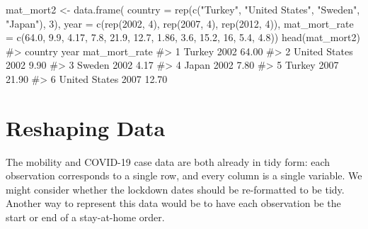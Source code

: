\documentclass[
  letterpaper,
]{latex/krantz}
\makeatletter
\newenvironment{Shaded}{\begin{snugshade}}{\end{snugshade}}
\newcommand{\AttributeTok}[1]{\textcolor[rgb]{0.40,0.45,0.13}{#1}}
\newcommand{\CommentTok}[1]{\textcolor[rgb]{0.37,0.37,0.37}{#1}}
\newcommand{\DecValTok}[1]{\textcolor[rgb]{0.68,0.00,0.00}{#1}}
\newcommand{\FloatTok}[1]{\textcolor[rgb]{0.68,0.00,0.00}{#1}}
\newcommand{\FunctionTok}[1]{\textcolor[rgb]{0.28,0.35,0.67}{#1}}
\newcommand{\NormalTok}[1]{\textcolor[rgb]{0.00,0.23,0.31}{#1}}
\newcommand{\OtherTok}[1]{\textcolor[rgb]{0.00,0.23,0.31}{#1}}
\newcommand{\StringTok}[1]{\textcolor[rgb]{0.13,0.47,0.30}{#1}}
\newenvironment{kframe}{%
\medskip{}
\setlength{\fboxsep}{.8em}
 \def\at@end@of@kframe{}%
 \ifinner\ifhmode%
  \def\at@end@of@kframe{\end{minipage}}%
  \begin{minipage}{\columnwidth}%
 \fi\fi%
 \def\FrameCommand##1{\hskip\@totalleftmargin \hskip-\fboxsep
 \colorbox{shadecolor}{##1}\hskip-\fboxsep
     \hskip-\linewidth \hskip-\@totalleftmargin \hskip\columnwidth}%
 \MakeFramed {\advance\hsize-\width
   \@totalleftmargin\z@ \linewidth\hsize
   \@setminipage}}%
 {\par\unskip\endMakeFramed%
 \at@end@of@kframe}
\renewenvironment{Shaded}{\begin{kframe}}{\end{kframe}}
\makeatother
\begin{document}
\begin{Shaded}
\begin{Highlighting}[]
\NormalTok{mat\_mort2 }\OtherTok{\textless{}{-}} \FunctionTok{data.frame}\NormalTok{(}
    \AttributeTok{country =} \FunctionTok{rep}\NormalTok{(}\FunctionTok{c}\NormalTok{(}\StringTok{"Turkey"}\NormalTok{, }\StringTok{"United States"}\NormalTok{, }\StringTok{"Sweden"}\NormalTok{, }\StringTok{"Japan"}\NormalTok{), }\DecValTok{3}\NormalTok{),}
    \AttributeTok{year =} \FunctionTok{c}\NormalTok{(}\FunctionTok{rep}\NormalTok{(}\DecValTok{2002}\NormalTok{, }\DecValTok{4}\NormalTok{), }\FunctionTok{rep}\NormalTok{(}\DecValTok{2007}\NormalTok{, }\DecValTok{4}\NormalTok{), }\FunctionTok{rep}\NormalTok{(}\DecValTok{2012}\NormalTok{, }\DecValTok{4}\NormalTok{)),}
    \AttributeTok{mat\_mort\_rate =} \FunctionTok{c}\NormalTok{(}\FloatTok{64.0}\NormalTok{, }\FloatTok{9.9}\NormalTok{, }\FloatTok{4.17}\NormalTok{, }\FloatTok{7.8}\NormalTok{, }\FloatTok{21.9}\NormalTok{, }\FloatTok{12.7}\NormalTok{, }\FloatTok{1.86}\NormalTok{, }\FloatTok{3.6}\NormalTok{, }
                      \FloatTok{15.2}\NormalTok{, }\DecValTok{16}\NormalTok{, }\FloatTok{5.4}\NormalTok{, }\FloatTok{4.8}\NormalTok{))}
\FunctionTok{head}\NormalTok{(mat\_mort2)}
\CommentTok{\#\textgreater{}         country year mat\_mort\_rate}
\CommentTok{\#\textgreater{} 1        Turkey 2002         64.00}
\CommentTok{\#\textgreater{} 2 United States 2002          9.90}
\CommentTok{\#\textgreater{} 3        Sweden 2002          4.17}
\CommentTok{\#\textgreater{} 4         Japan 2002          7.80}
\CommentTok{\#\textgreater{} 5        Turkey 2007         21.90}
\CommentTok{\#\textgreater{} 6 United States 2007         12.70}
\end{Highlighting}
\end{Shaded}

\section{\texorpdfstring{Reshaping Data 
}{Reshaping Data  }}\label{reshaping-data}

The mobility and COVID-19 case data are both already in tidy form: each
observation corresponds to a single row, and every column is a single
variable. We might consider whether the lockdown dates should be
re-formatted to be tidy. Another way to represent this data would be to
have each observation be the start or end of a stay-at-home order.
\end{document}

